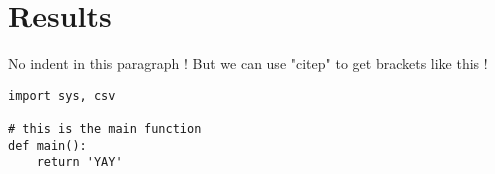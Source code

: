 \section*{Results}
\label{sec:results}

\noindent No indent in this paragraph \cite[see][]{Kim2010}! But we can use "citep" to get brackets like this \citep{Kim2010}!

\lipsum 

\faTwitter



\begin{lstlisting}
import sys, csv

# this is the main function
def main():
    return 'YAY'
\end{lstlisting}
%